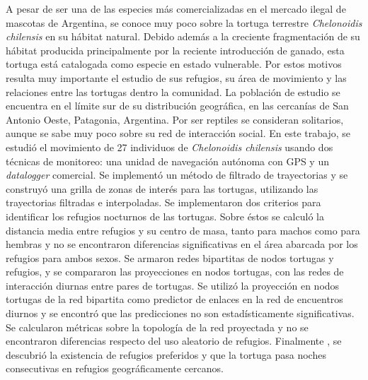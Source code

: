 \begin{resumen}%
    A pesar de ser una de las especies más comercializadas en el mercado ilegal de mascotas de Argentina, se conoce muy poco sobre la tortuga 
    terrestre \textit{Chelonoidis chilensis} en su hábitat natural. Debido 
    además a la creciente fragmentación de su hábitat producida principalmente 
    por la reciente introducción de ganado, esta tortuga está catalogada como 
    especie en estado 
    vulnerable. Por estos motivos resulta muy importante el 
    estudio de sus refugios, su área de movimiento y las relaciones entre 
    las tortugas dentro la comunidad. La población de estudio se encuentra 
    en el límite sur de su distribución geográfica, en las cercanías de
    San Antonio Oeste, Patagonia, Argentina. Por ser reptiles se 
    consideran 
    solitarios, aunque se sabe muy poco sobre su red de interacción social. 
    En este trabajo, se estudió el movimiento de 27 individuos 
    de \textit{Chelonoidis chilensis} usando dos técnicas de monitoreo: 
    una unidad de navegación  autónoma con GPS y un \textit{datalogger} comercial. 
    Se implementó un método de filtrado de trayectorias y se construyó una 
    grilla de zonas de interés para las tortugas, utilizando las 
    trayectorias filtradas e interpoladas. Se implementaron dos criterios 
    para identificar los refugios nocturnos de las tortugas. Sobre éstos 
    se calculó la distancia media entre refugios y su centro de masa, 
    tanto para machos como para hembras y no se 
    encontraron 
    diferencias significativas en el área abarcada por los refugios para 
    ambos sexos. Se armaron redes bipartitas de nodos 
    tortugas y refugios, y se compararon las proyecciones en nodos tortugas, 
    con las redes de interacción diurnas entre pares de tortugas. Se utilizó 
    la proyección en nodos tortugas de 
    la red bipartita como predictor de enlaces en la red de encuentros diurnos
    y se encontró que las predicciones no son estadísticamente significativas. 
    Se calcularon métricas sobre la topología de la red proyectada y no se 
    encontraron diferencias respecto del uso aleatorio de refugios. Finalmente
    , se descubrió la existencia de refugios preferidos y que 
    la tortuga pasa noches consecutivas en refugios geográficamente cercanos.
\end{resumen}

